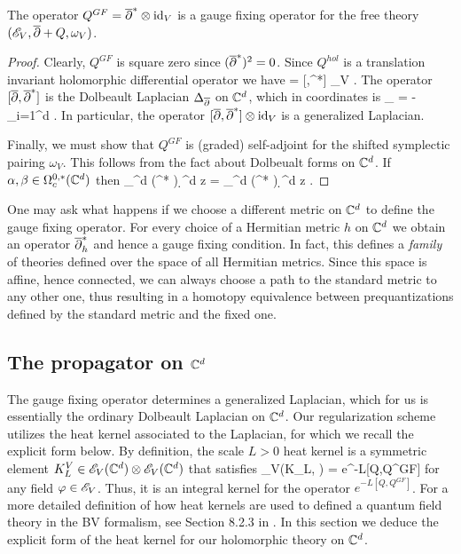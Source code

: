 \documentclass[11pt]{amsart}
\begin{document}
\begin{lem}
The operator $Q^{GF} = \overline{\partial}^* \otimes {\rm id}_V$ is a gauge fixing operator for the free theory $(\mathscr E_V, \overline{\partial} + Q, \omega_V)$.
\end{lem}
\begin{proof}
Clearly, $Q^{GF}$ is square zero since $(\overline{\partial}^*)^2 = 0$.
Since $Q^{hol}$ is a translation invariant holomorphic differential operator we have
 = [\dbar,\dbar^*] \tensor \id_{V} .
\een
The operator $[\overline{\partial},\overline{\partial}^*]$ is the Dolbeault Laplacian $\Delta_{\overline{\partial}}$ on $\mathbb C^d$, which 
in coordinates is
\ben
\Delta_{\dbar} = -\sum_{i=1}^d  .
\een
In particular, the operator $[\overline{\partial},\overline{\partial}^*] \otimes {\rm id}_{V}$ is a generalized Laplacian. 

Finally, we must show that $Q^{GF}$ is (graded) self-adjoint for the shifted symplectic pairing $\omega_V$. 
This follows from the fact about Dolbeualt forms on $\mathbb C^d$.
If $\alpha,\beta \in \Omega^{0,*}_c(\mathbb C^d)$ then
\ben 
\int_{\CC^d} (\dbar^* \alpha) \wedge \beta \wedge \d^d z = \pm \int_{\CC^d} \alpha \wedge (\dbar^* \beta) \wedge \d^d z .
\een
\end{proof}

\begin{rmk}
One may ask what happens if we choose a different metric on $\mathbb C^d$ to define the gauge fixing operator. 
For every choice of a Hermitian metric $h$ on $\mathbb C^d$ we obtain an operator $\overline{\partial}^*_h$ and hence a gauge fixing condition. 
In fact, this defines a {\em family} of theories defined over the space of all Hermitian metrics. 
Since this space is affine, hence connected, we can always choose a path to the standard metric to any other one, thus resulting in a homotopy equivalence between prequantizations defined by the standard metric and the fixed one. 
\end{rmk}

\subsection{The propagator on $\mathbb C^d$}

The gauge fixing operator determines a generalized Laplacian, which for us is essentially the ordinary Dolbeault Laplacian on $\mathbb C^d$. 
Our regularization scheme utilizes the heat kernel associated to the Laplacian, for which we recall the explicit form below.
By definition, the scale $L>0$ heat kernel is a symmetric element $K_L^V \in \mathscr E_V(\mathbb C^d) \otimes \mathscr E_V(\mathbb C^d)$ that satisfies
\ben
\omega_V(K_L, \varphi) = e^{-L[Q,Q^{GF}] } \varphi
\een
for any field $\varphi \in \mathscr E_V$.
Thus, it is an integral kernel for the operator $e^{-L[Q,Q^{GF}]}$. 
For a more detailed definition of how heat kernels are used to defined a quantum field theory in the BV formalism, see Section 8.2.3 in \cite{CG2}. 
In this section we deduce the explicit form of the heat kernel for our holomorphic theory on $\mathbb C^d$. 
\end{document}
